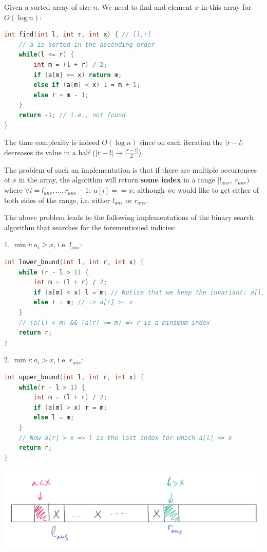 

Given a sorted array of size $n$. We need to find and element $x$ in this array for $O(\log{n})$:


\begin{lstlisting}[language=C++]
int find(int l, int r, int x) { // [l,r]
    // a is sorted in the ascending order
    while(l <= r) {
        int m = (l + r) / 2;
        if (a[m] == x) return m;
        else if (a[m] < x) l = m + 1;
        else r = m - 1;
    }
    return -1; // i.e., not found
}
\end{lstlisting}

The time complexity is indeed $O(\log{n})$ since on each iteration the $|r - l|$ decreases its value in a half ($|r - l| \to \frac{|r-l|}{2}$).

The problem of such an implementation is that if there are multiple occurrences of $x$ in the array, the algorithm will return \textbf{some index} in a range $[l_{ans}, \ r_{ans})$ where $\forall i=l_{ans}, ..., r_{ans}-1: \ a[i] == x$, although we would like to get either of both sides of the range, i.e. either $l_{ans}$ or $r_{ans}$.


The above problem leads to the following implementations of the binary search algorithm that searches for the forementioned indicies:

1. $\min{i}: a_i \geq x$, i.e. $l_{ans}$:

\begin{lstlisting}[language=C++]
int lower_bound(int l, int r, int x) {
    while (r - l > 1) {
        int m = (l + r) / 2;
        if (a[m] < x) l = m; // Notice that we keep the invariant: a[l] < x
        else r = m; // => a[r] >= x
    }
    // (a[l] < m) && (a[r] >= m) => r is a minimum index
    return r;
}
\end{lstlisting}

2. $\min{i}: a_i > x$, i.e. $r_{ans}$:

\begin{lstlisting}[language=C++]
int upper_bound(int l, int r, int x) {
    while(r - l > 1) {
        int m = (l + r) / 2;
        if (a[m] > x) r = m;
        else l = m;
    }
    // Now a[r] > x => l is the last index for which a[l] <= x
    return r;
}
\end{lstlisting}

\begin{center}
    \includegraphics[scale=0.6]{./assets/08-binary-search/1.PNG}
\end{center}


